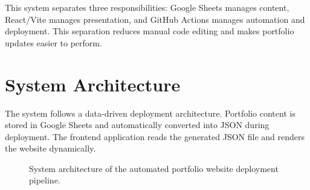 \documentclass[10pt,a4paper,twocolumn]{article}
\begin{document}
This system separates three responsibilities: Google Sheets manages content, React/Vite manages presentation, and GitHub Actions manages automation and deployment. This separation reduces manual code editing and makes portfolio updates easier to perform.

\section{System Architecture}

The system follows a data-driven deployment architecture. Portfolio content is stored in Google Sheets and automatically converted into JSON during deployment. The frontend application reads the generated JSON file and renders the website dynamically.

\begin{figure}[H]
\centering
{}
\caption{System architecture of the automated portfolio website deployment pipeline.}
\label{fig:architecture}
\end{figure}

\end{document}
